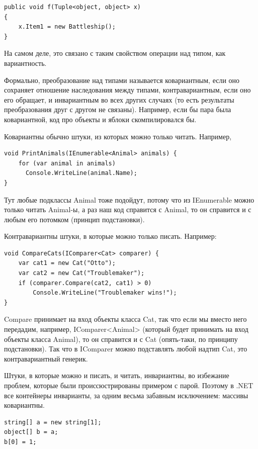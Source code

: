 \documentclass[a5paper]{article}
\begin{document}
\begin{verbatim}
public void f(Tuple<object, object> x)
{
    x.Item1 = new Battleship();
}
\end{verbatim}

На самом деле, это связано с таким свойством операции над типом, как вариантность.

Формально, преобразование над типами называется ковариантным, если оно сохраняет отношение наследования между типами, контравариантным, если оно его обращает, и инвариантным во всех других случаях (то есть результаты преобразования друг с другом не связаны). Например, если бы пара была ковариантной, код про объекты и яблоки скомпилировался бы. 

Ковариантны обычно штуки, из которых можно только читать. Например,

\begin{verbatim}
void PrintAnimals(IEnumerable<Animal> animals) {
    for (var animal in animals)
      Console.WriteLine(animal.Name);
}
\end{verbatim}

Тут любые подклассы Animal тоже подойдут, потому что из IEnumerable можно только читать Animal-ы, а раз наш код справится с Animal, то он справится и с любым его потомком (принцип подстановки).

Контравариантны штуки, в которые можно только писать. Например:

\begin{verbatim}
void CompareCats(IComparer<Cat> comparer) {
    var cat1 = new Cat("Otto");
    var cat2 = new Cat("Troublemaker");
    if (comparer.Compare(cat2, cat1) > 0) 
        Console.WriteLine("Troublemaker wins!");
}
\end{verbatim}

Compare принимает на вход объекты класса Cat, так что если мы вместо него передадим, например, IComparer<Animal> (который будет принимать на вход объекты класса Animal), то он справится и с Cat (опять-таки, по принципу подстановки). Так что в IComparer можно подставлять любой надтип Cat, это контравариантный генерик.

Штуки, в которые можно и писать, и читать, инвариантны, во избежание проблем, которые были происсюстрированы примером с парой. Поэтому в .NET все контейнеры инварианты, за одним весьма забавным исключением: массивы ковариантны.

\begin{verbatim}
string[] a = new string[1];
object[] b = a;
b[0] = 1;
\end{verbatim}
\end{document}
